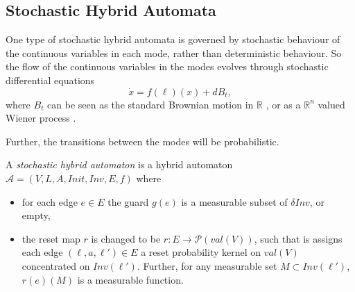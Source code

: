 \subsection{Stochastic Hybrid Automata}

One type of stochastic hybrid automata is governed by stochastic behaviour of the continuous variables in each mode, rather than deterministic behaviour. So the flow of the continuous variables in the modes evolves through stochastic differential equations
\[
\dot{x} = f(\ell)(x) + dB_{t},
\]
where $B_{t}$ can be seen as the standard Brownian motion in $\mathbb{R}$ \cite{Hu2000}, or as a $\mathbb{R}^{n}$ valued Wiener process \cite{Koutsoukos2006}.

Further, the transitions between the modes will be probabilistic.

\begin{defi}
A \emph{stochastic hybrid automaton} is a hybrid automaton $\mathcal{A}=(V,L,A,Init,Inv,E,f)$ where
\begin{itemize}
    \item{for each edge $e\in E$ the guard $g(e)$ is a measurable subset of $\delta Inv$, or empty,}
    \item{the reset map $r$ is changed to be $r : E \rightarrow \mathcal{P}(val(V))$, such that is assigns each edge $(\ell,a,\ell')\in E$ a reset probability kernel on $val(V)$ concentrated on $Inv(\ell')$. Further, for any measurable set $M\subset Inv(\ell')$, $r(e)(M)$ is a measurable function.}
\end{itemize}
\end{defi}

